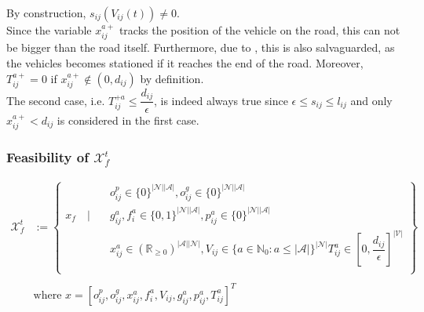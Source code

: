 By construction, $s_{ij}(V_{ij}(t)) \neq 0$.\\
Since the variable $x_{ij}^{a+}$ tracks the position of the vehicle on the road, this can not be bigger than the road itself. Furthermore, due to , this is also salvaguarded, as the vehicles becomes stationed if it reaches the end of the road. Moreover, $T_{ij}^{a+} =0$ if $x_{ij}^{a+} \not\in  (0,d_{ij})$ by definition. \\
The second case, i.e. $T_{ij}^{+a} \leq \dfrac{d_{ij}}{\epsilon}$, is indeed always true since $\epsilon \leq s_{ij} \leq l_{ij}$ and only $x_{ij}^{a+} < d_{ij}$ is considered in the first case.\\

\subsubsection{Feasibility of $\mathcal{X}^t_f$}
\begin{equation}
	\begin{aligned}
		\mathcal{X}^t_f &:= \left\{
		\begin{aligned}
			& o^p_{ij} \in \{0\}^{|\mathcal{N}||\mathcal{A}|} , o^g_{ij} \in \{0\}^{|\mathcal{N}||\mathcal{A}|}  \\
			x_f \quad \Bigg| \quad &g^a_{ij},f^a_{i} \in \{0,1\}^{|\mathcal{N}||\mathcal{A}|},  p^a_{ij}\in \{0\}^{|\mathcal{N}||\mathcal{A}|}\\%
			&  x_{ij}^a\in (\mathbb{R}_{\ge 0})^{|\mathcal{A}||\mathcal{N}|}, V_{ij} \in \{ a \in \mathbb{N}_0: a \leq |\mathcal{A}| \}^{|\mathcal{N}|} T^a_{ij} \in [0, \dfrac{d_{ij}}{\epsilon}]^{|\mathcal{V}|}\\%
		\end{aligned}
		\right\}\\
		&\\
		&\text{where }  x = [o^p_{ij},o^g_{ij}, x_{ij}^a, f^a_{i}, V_{ij} , g^a_{ij}, p^a_{ij}, T^a_{ij}]^T
	\end{aligned}
	\label{appendix:eq:final_x_f}
\end{equation}\\


